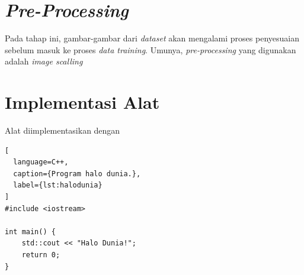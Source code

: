 \section{\textit{Pre-Processing}}
\label{sec:preprocessing}

Pada tahap ini, gambar-gambar dari \textit{dataset} akan mengalami proses penyesuaian sebelum masuk ke proses \textit{data training}. Umunya, \textit{pre-processing} yang digunakan adalah \textit{image scalling}



\section{Implementasi Alat
\label{sec:implementasi alat}}

Alat diimplementasikan dengan \lipsum[1]

\begin{lstlisting}[
  language=C++,
  caption={Program halo dunia.},
  label={lst:halodunia}
]
#include <iostream>

int main() {
    std::cout << "Halo Dunia!";
    return 0;
}
\end{lstlisting}

\lipsum[2-3]



\lipsum[4]
